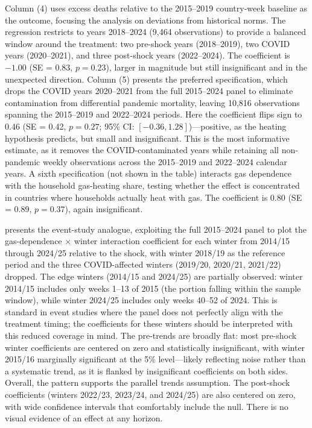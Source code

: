 \documentclass[12pt]{article}
\begin{document}
Column (4) uses excess deaths relative to the 2015--2019 country-week baseline as the outcome, focusing the analysis on deviations from historical norms. The regression restricts to years 2018--2024 (9,464 observations) to provide a balanced window around the treatment: two pre-shock years (2018--2019), two COVID years (2020--2021), and three post-shock years (2022--2024). The coefficient is $-1.00$ (SE = 0.83, $p = 0.23$), larger in magnitude but still insignificant and in the unexpected direction. Column (5) presents the preferred specification, which drops the COVID years 2020--2021 from the full 2015--2024 panel to eliminate contamination from differential pandemic mortality, leaving 10,816 observations spanning the 2015--2019 and 2022--2024 periods. Here the coefficient flips sign to 0.46 (SE = 0.42, $p = 0.27$; 95\% CI: $[-0.36, 1.28]$)---positive, as the heating hypothesis predicts, but small and insignificant. This is the most informative estimate, as it removes the COVID-contaminated years while retaining all non-pandemic weekly observations across the 2015--2019 and 2022--2024 calendar years. A sixth specification (not shown in the table) interacts gas dependence with the household gas-heating share, testing whether the effect is concentrated in countries where households actually heat with gas. The coefficient is 0.80 (SE = 0.89, $p = 0.37$), again insignificant.

 presents the event-study analogue, exploiting the full 2015--2024 panel to plot the gas-dependence $\times$ winter interaction coefficient for each winter from 2014/15 through 2024/25 relative to the shock, with winter 2018/19 as the reference period and the three COVID-affected winters (2019/20, 2020/21, 2021/22) dropped. The edge winters (2014/15 and 2024/25) are partially observed: winter 2014/15 includes only weeks 1--13 of 2015 (the portion falling within the sample window), while winter 2024/25 includes only weeks 40--52 of 2024. This is standard in event studies where the panel does not perfectly align with the treatment timing; the coefficients for these winters should be interpreted with this reduced coverage in mind. The pre-trends are broadly flat: most pre-shock winter coefficients are centered on zero and statistically insignificant, with winter 2015/16 marginally significant at the 5\% level---likely reflecting noise rather than a systematic trend, as it is flanked by insignificant coefficients on both sides. Overall, the pattern supports the parallel trends assumption. The post-shock coefficients (winters 2022/23, 2023/24, and 2024/25) are also centered on zero, with wide confidence intervals that comfortably include the null. There is no visual evidence of an effect at any horizon.
\end{document}
